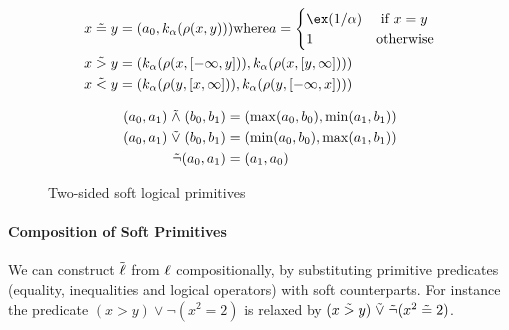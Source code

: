   \begin{align*}
  x \dsoft{=} y &= (a_0, k_\alpha(\rho(x, y))) \text{where} a = \begin{cases}
    \ex(1/\alpha) & \text{ if } x = y\\
    1             & \text{otherwise}
  \end{cases}\\
  x \dsoft{>} y &= (k_\alpha(\rho(x, [-\infty, y])), k_\alpha(\rho(x, [y, \infty])))\\
  x \dsoft{<} y &= (k_\alpha(\rho(y, [x, \infty])), k_\alpha(\rho(y, [-\infty, x])))\\
  \end{align*}
  


\begin{figure}
\begin{align*}
(a_0, a_1) \mathrel{\tilde{\land}} (b_0, b_1) &= (\max(a_0, b_0), \min(a_1, b_1))\\
(a_0, a_1) \mathrel{\tilde{\lor}} (b_0, b_1) &= (\min(a_0, b_0), \max(a_1, b_1))\\
\tilde{\neg}(a_0, a_1) &= (a_1, a_0)
\end{align*}
\caption{Two-sided soft logical primitives}
\label{softw}
\end{figure}


\paragraph{Composition of Soft Primitives} We can construct $\mathrel{\tilde{\operatorname{\ell}}}$ from $\operatorname{\ell}$ compositionally, by substituting primitive predicates (equality, inequalities and logical operators) with soft counterparts.
For instance the predicate $(x > y) \lor \neg(x^2 = 2)$ is relaxed by $(x \mathrel{\tilde{>}} y) \mathrel{\tilde{\lor}} \tilde{\neg}(x^2 \mathrel{\tilde{=}} 2)$.

